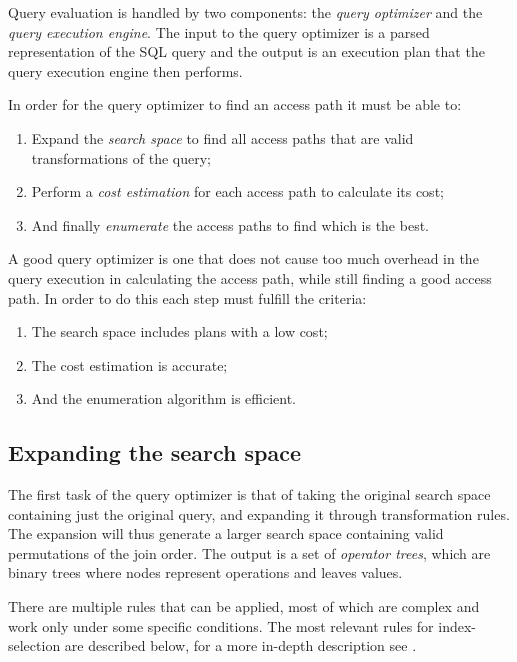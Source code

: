 Query evaluation is handled by two components: the \textit{query optimizer} and the \textit{query execution engine}. The input to the query optimizer is a parsed representation of the SQL query and the output is an execution plan that the query execution engine then performs.

In order for the query optimizer to find an access path it must be able to:
\begin{enumerate}
    \item Expand the \textit{search space} to find all access paths that are valid transformations of the query;
    \item Perform a \textit{cost estimation} for each access path to calculate its cost;
    \item And finally \textit{enumerate} the access paths to find which is the best.
\end{enumerate}

A good query optimizer is one that does not cause too much overhead in the query execution in calculating the access path, while still finding a good access path. In order to do this each step must fulfill the criteria:
\begin{enumerate}
    \item The search space includes plans with a low cost;
    \item The cost estimation is accurate;
    \item And the enumeration algorithm is efficient.
\end{enumerate}

\subsection{Expanding the search space}
The first task of the query optimizer is that of taking the original search space containing just the original query, and expanding it through transformation rules. The expansion will thus generate a larger search space containing valid permutations of the join order. The output is a set of \textit{operator trees}, which are binary trees where nodes represent operations and leaves values.

There are multiple rules that can be applied, most of which are complex and work only under some specific conditions. The most relevant rules for index-selection are described below, for a more in-depth description see \cite{chaudhuri_1998_overview_aooqoirs}.

